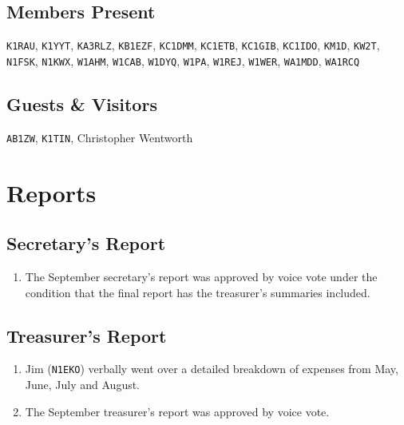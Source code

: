 \documentclass[10pt,letterpaper]{article}
\begin{document}
\subsection{Members Present}

\texttt{K1RAU},
\texttt{K1YYT},
\texttt{KA3RLZ},
\texttt{KB1EZF},
\texttt{KC1DMM},
\texttt{KC1ETB},
\texttt{KC1GIB},
\texttt{KC1IDO},
\texttt{KM1D},
\texttt{KW2T},
\texttt{N1FSK},
\texttt{N1KWX},
\texttt{W1AHM},
\texttt{W1CAB},
\texttt{W1DYQ},
\texttt{W1PA},
\texttt{W1REJ},
\texttt{W1WER},
\texttt{WA1MDD},
\texttt{WA1RCQ}

\subsection{Guests \& Visitors}

\texttt{AB1ZW},
\texttt{K1TIN}, 
Christopher Wentworth


\section{Reports}

\subsection{Secretary's Report}
\begin{enumerate}
  \item The September secretary's report was approved by voice vote under the condition that the final report has the treasurer's summaries included.
\end{enumerate}

\newpage
\subsection{Treasurer's Report}
\begin{enumerate}
  \item Jim (\texttt{N1EKO}) verbally went over a detailed breakdown of expenses from May, June, July and August.
  \item The September treasurer's report was approved by voice vote.
\end{enumerate}
\end{document}
